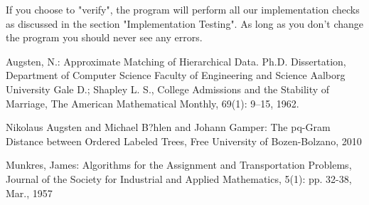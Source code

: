 \documentclass[a4paper,11pt]{article}
\begin{document}
If you choose to "verify", the program will perform all our implementation checks as discussed in the section "Implementation Testing". As long as you don't change the program you should never see any errors.


\begin{thebibliography}{9999}
Augsten, N.: Approximate Matching of Hierarchical Data. 
Ph.D. Dissertation, Department of Computer Science Faculty of Engineering and Science Aalborg University
Gale D.; Shapley L. S., College Admissions and the Stability of Marriage, The American Mathematical Monthly,  69(1): 9–15, 1962.

Nikolaus Augsten and Michael B?hlen and Johann Gamper: The pq-Gram Distance between Ordered Labeled Trees, Free University of Bozen-Bolzano, 2010 

Munkres, James: Algorithms for the Assignment and Transportation Problems, Journal of the Society for Industrial and Applied Mathematics, 5(1): pp. 32-38, Mar., 1957

\end{thebibliography}
\end{document}
